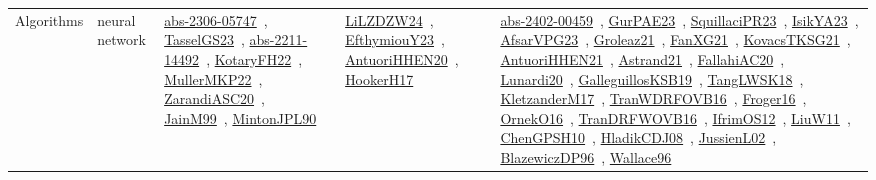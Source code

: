 {\begin{longtable}{lp{3cm}>{\raggedright\arraybackslash}p{6cm}>{\raggedright\arraybackslash}p{6cm}>{\raggedright\arraybackslash}p{8cm}}
Algorithms & neural network & \href{../works/abs-2306-05747.pdf}{abs-2306-05747}~\cite{abs-2306-05747}, \href{../works/TasselGS23.pdf}{TasselGS23}~\cite{TasselGS23}, \href{../works/abs-2211-14492.pdf}{abs-2211-14492}~\cite{abs-2211-14492}, \href{../works/KotaryFH22.pdf}{KotaryFH22}~\cite{KotaryFH22}, \href{../works/MullerMKP22.pdf}{MullerMKP22}~\cite{MullerMKP22}, \href{../works/ZarandiASC20.pdf}{ZarandiASC20}~\cite{ZarandiASC20}, \href{../works/JainM99.pdf}{JainM99}~\cite{JainM99}, \href{../works/MintonJPL90.pdf}{MintonJPL90}~\cite{MintonJPL90} & \href{../works/LiLZDZW24.pdf}{LiLZDZW24}~\cite{LiLZDZW24}, \href{../works/EfthymiouY23.pdf}{EfthymiouY23}~\cite{EfthymiouY23}, \href{../works/AntuoriHHEN20.pdf}{AntuoriHHEN20}~\cite{AntuoriHHEN20}, \href{../works/HookerH17.pdf}{HookerH17}~\cite{HookerH17} & \href{../works/abs-2402-00459.pdf}{abs-2402-00459}~\cite{abs-2402-00459}, \href{../works/GurPAE23.pdf}{GurPAE23}~\cite{GurPAE23}, \href{../works/SquillaciPR23.pdf}{SquillaciPR23}~\cite{SquillaciPR23}, \href{../works/IsikYA23.pdf}{IsikYA23}~\cite{IsikYA23}, \href{../works/AfsarVPG23.pdf}{AfsarVPG23}~\cite{AfsarVPG23}, \href{../works/Groleaz21.pdf}{Groleaz21}~\cite{Groleaz21}, \href{../works/FanXG21.pdf}{FanXG21}~\cite{FanXG21}, \href{../works/KovacsTKSG21.pdf}{KovacsTKSG21}~\cite{KovacsTKSG21}, \href{../works/AntuoriHHEN21.pdf}{AntuoriHHEN21}~\cite{AntuoriHHEN21}, \href{../works/Astrand21.pdf}{Astrand21}~\cite{Astrand21}, \href{../works/FallahiAC20.pdf}{FallahiAC20}~\cite{FallahiAC20}, \href{../works/Lunardi20.pdf}{Lunardi20}~\cite{Lunardi20}, \href{../works/GalleguillosKSB19.pdf}{GalleguillosKSB19}~\cite{GalleguillosKSB19}, \href{../works/TangLWSK18.pdf}{TangLWSK18}~\cite{TangLWSK18}, \href{../works/KletzanderM17.pdf}{KletzanderM17}~\cite{KletzanderM17}, \href{../works/TranWDRFOVB16.pdf}{TranWDRFOVB16}~\cite{TranWDRFOVB16}, \href{../works/Froger16.pdf}{Froger16}~\cite{Froger16}, \href{../works/OrnekO16.pdf}{OrnekO16}~\cite{OrnekO16}, \href{../works/TranDRFWOVB16.pdf}{TranDRFWOVB16}~\cite{TranDRFWOVB16}, \href{../works/IfrimOS12.pdf}{IfrimOS12}~\cite{IfrimOS12}, \href{../works/LiuW11.pdf}{LiuW11}~\cite{LiuW11}, \href{../works/ChenGPSH10.pdf}{ChenGPSH10}~\cite{ChenGPSH10}, \href{../works/HladikCDJ08.pdf}{HladikCDJ08}~\cite{HladikCDJ08}, \href{../works/JussienL02.pdf}{JussienL02}~\cite{JussienL02}, \href{../works/BlazewiczDP96.pdf}{BlazewiczDP96}~\cite{BlazewiczDP96}, \href{../works/Wallace96.pdf}{Wallace96}~\cite{Wallace96}\\

\end{longtable}}
